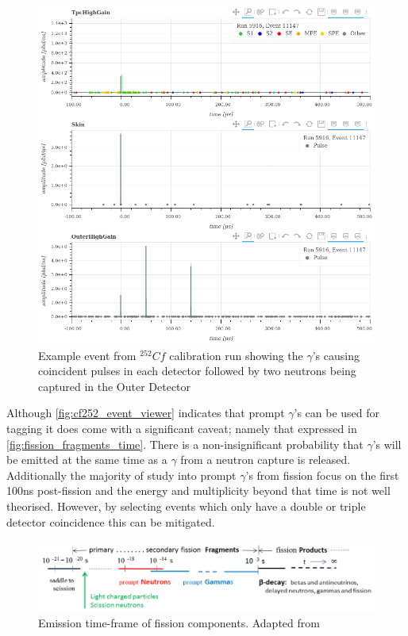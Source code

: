 \begin{figure}[!htbp]
\includegraphics[width=\textwidth]{Figures/NeutronCaptureTime/cf252_eventviewer_5916.png}
\centering
\caption{Example event from ${}^{252}{Cf}$ calibration run showing the $\gamma$'s causing coincident pulses in each detector followed by two neutrons being captured in the Outer Detector}
\label{fig:cf252_event_viewer}
\end{figure}

\par
Although \autoref{fig:cf252_event_viewer} indicates that prompt $\gamma$'s can be used for tagging it does come with a significant caveat; namely that expressed in \autoref{fig:fission_fragments_time}.
There is a non-insignificant probability that $\gamma$'s will be emitted at the same time as a $\gamma$ from a neutron capture is released.
Additionally the majority of study into prompt $\gamma$'s from fission focus on the first 100ns post-fission and the energy and multiplicity beyond that time is not well theorised. 
However, by selecting events which only have a double or triple detector coincidence this can be mitigated.


\begin{figure}[!htbp]
\includegraphics[width=13cm]{Figures/NeutronCaptureTime/fission_fragment_times.png}
\centering
\caption{Emission time-frame of fission components. Adapted from \cite{cf252_fission_ref}}
\label{fig:fission_fragments_time}
\end{figure}




